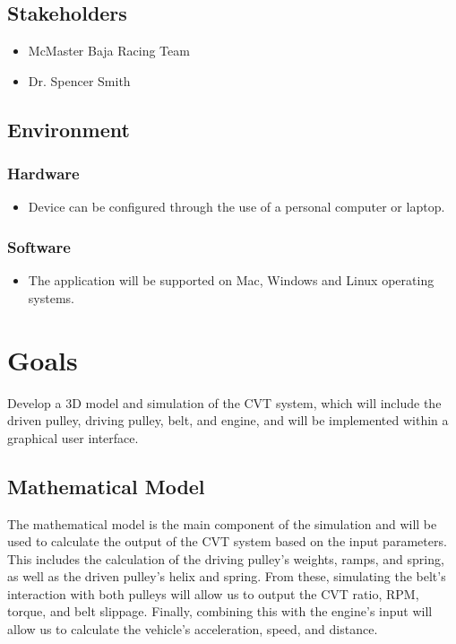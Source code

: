\documentclass{article}
\begin{document}
\subsection{Stakeholders}
\begin{itemize}
    \item McMaster Baja Racing Team
    \item Dr. Spencer Smith
\end{itemize}

\subsection{Environment}
\subsubsection{Hardware}
\begin{itemize}
    \item Device can be configured through the use of a personal computer or laptop.
\end{itemize}
    \subsubsection{Software}
\begin{itemize}
    \item The application will be supported on Mac, Windows and Linux operating
    systems.
\end{itemize}

\section{Goals}

Develop a 3D model and simulation of the CVT system, which will include the driven pulley, 
driving pulley, belt, and engine, and will be implemented within a graphical user interface.

\subsection{Mathematical Model}
The mathematical model is the main component of the simulation and will be used to 
calculate the output of the CVT system based on the input parameters.
This includes the calculation of the driving pulley's weights, ramps, and spring, 
as well as the driven pulley's helix and spring.
From these, simulating the belt's interaction with both pulleys will allow us to output 
the CVT ratio, RPM, torque, and belt slippage. Finally, combining this with the engine's input
will allow us to calculate the vehicle's acceleration, speed, and distance.
\end{document}
